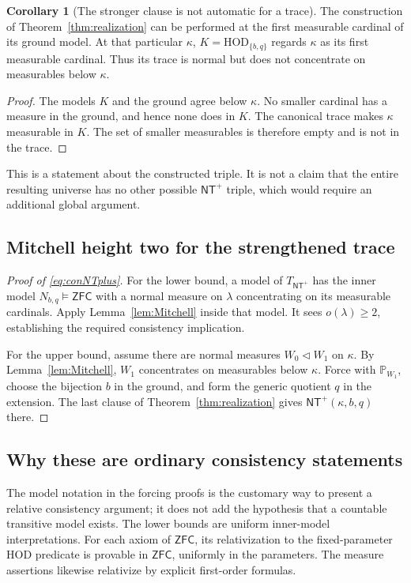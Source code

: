 \documentclass[11pt,letterpaper]{article}
\theoremstyle{definition}
\newtheorem{corollary}[definition]{Corollary}
\numberwithin{equation}{section}
\newcommand{\ZFC}{\mathsf{ZFC}}
\newcommand{\HOD}{\mathrm{HOD}}
\newcommand{\PP}{\mathbb P}
\newcommand{\NTP}{\mathsf{NT}^{+}}
\begin{document}
\begin{corollary}[The stronger clause is not automatic for a trace]
The construction of Theorem~\ref{thm:realization} can be performed at
the first measurable cardinal of its ground model. At that particular
$\kappa$, $K=\HOD_{\{b,q\}}$ regards $\kappa$ as its first measurable
cardinal. Thus its trace is normal but does not concentrate on
measurables below $\kappa$.
\end{corollary}

\begin{proof}
The models $K$ and the ground agree below $\kappa$. No smaller
cardinal has a measure in the ground, and hence none does in $K$.
The canonical trace makes $\kappa$ measurable in $K$. The set of
smaller measurables is therefore empty and is not in the trace.
\end{proof}

This is a statement about the constructed triple. It is not a claim
that the entire resulting universe has no other possible $\NTP$
triple, which would require an additional global argument.

\subsection{Mitchell height two for the strengthened trace}

\begin{proof}[Proof of \eqref{eq:conNTplus}]
For the lower bound, a model of $T_{\NTP}$ has the inner model
$N_{b,q}\models\ZFC$ with a normal measure on $\lambda$ concentrating
on its measurable cardinals. Apply Lemma~\ref{lem:Mitchell} inside
that model. It sees $o(\lambda)\ge2$, establishing the required
consistency implication.

For the upper bound, assume there are normal measures
$W_0\triangleleft W_1$ on $\kappa$. By Lemma~\ref{lem:Mitchell},
$W_1$ concentrates on measurables below $\kappa$. Force with
$\PP_{W_1}$, choose the bijection $b$ in the ground, and form the
generic quotient $q$ in the extension. The last clause of
Theorem~\ref{thm:realization} gives $\NTP(\kappa,b,q)$ there.
\end{proof}

\subsection{Why these are ordinary consistency statements}

The model notation in the forcing proofs is the customary way to
present a relative consistency argument; it does not add the
hypothesis that a countable transitive model exists. The lower bounds
are uniform inner-model interpretations. For each axiom of $\ZFC$,
its relativization to the fixed-parameter HOD predicate is provable in
$\ZFC$, uniformly in the parameters. The measure assertions likewise
relativize by explicit first-order formulas.
\end{document}
